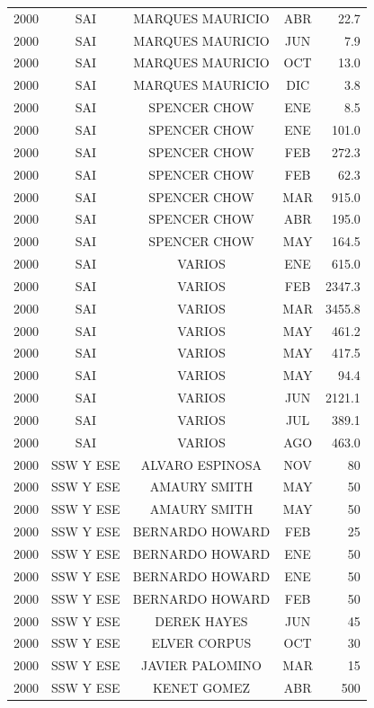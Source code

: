 \documentclass[12pt,]{article}
\begin{document}
\begin{table}[ht]
{\begin{tabular}{lcccr}
  2000 & SAI & MARQUES MAURICIO & ABR & 22.7 \\ 
  2000 & SAI & MARQUES MAURICIO & JUN & 7.9 \\ 
  2000 & SAI & MARQUES MAURICIO & OCT & 13.0 \\ 
  2000 & SAI & MARQUES MAURICIO & DIC & 3.8 \\ 
  2000 & SAI & SPENCER CHOW & ENE & 8.5 \\ 
  2000 & SAI & SPENCER CHOW & ENE & 101.0 \\ 
  2000 & SAI & SPENCER CHOW & FEB & 272.3 \\ 
  2000 & SAI & SPENCER CHOW & FEB & 62.3 \\ 
  2000 & SAI & SPENCER CHOW & MAR & 915.0 \\ 
  2000 & SAI & SPENCER CHOW & ABR & 195.0 \\ 
  2000 & SAI & SPENCER CHOW & MAY & 164.5 \\ 
  2000 & SAI & VARIOS & ENE & 615.0 \\ 
  2000 & SAI & VARIOS & FEB & 2347.3 \\ 
  2000 & SAI & VARIOS & MAR & 3455.8 \\ 
  2000 & SAI & VARIOS & MAY & 461.2 \\ 
  2000 & SAI & VARIOS & MAY & 417.5 \\ 
  2000 & SAI & VARIOS & MAY & 94.4 \\ 
  2000 & SAI & VARIOS & JUN & 2121.1 \\ 
  2000 & SAI & VARIOS & JUL & 389.1 \\ 
  2000 & SAI & VARIOS & AGO & 463.0 \\ 
  2000 & SSW Y ESE & ALVARO ESPINOSA & NOV & 80 \\ 
  2000 & SSW Y ESE & AMAURY SMITH & MAY & 50 \\ 
  2000 & SSW Y ESE & AMAURY SMITH & MAY & 50 \\ 
  2000 & SSW Y ESE & BERNARDO HOWARD & FEB & 25 \\ 
  2000 & SSW Y ESE & BERNARDO HOWARD & ENE & 50 \\ 
  2000 & SSW Y ESE & BERNARDO HOWARD & ENE & 50 \\ 
  2000 & SSW Y ESE & BERNARDO HOWARD & FEB & 50 \\ 
  2000 & SSW Y ESE & DEREK HAYES & JUN & 45 \\ 
  2000 & SSW Y ESE & ELVER CORPUS & OCT & 30 \\ 
  2000 & SSW Y ESE & JAVIER PALOMINO & MAR & 15 \\ 
  2000 & SSW Y ESE & KENET GOMEZ & ABR & 500 \\ 

\end{tabular}}
\end{table}
\end{document}
